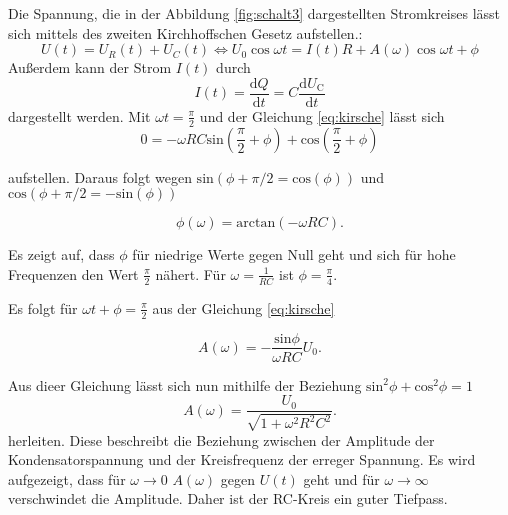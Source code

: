 \noindent Die Spannung, die in der Abbildung  \ref{fig:schalt3} dargestellten Stromkreises lässt sich  mittels des zweiten Kirchhoffschen Gesetz
aufstellen.:
\begin{equation}
    \label{eq:kirsche}
    U(t)=U_R(t)+U_C(t) \Leftrightarrow U_0 \cos{\omega t}=I(t)R + 
    A(\omega)\cos{\omega t + \phi}
\end{equation}
\noindent Außerdem kann der Strom $I(t)$ durch 
\begin{equation}
    I(t) = \frac{\text{d}Q}{\text{d}t} = C \frac{\text{d}U_\text{C}}{\text{d}t}
    \label{eqn:9}
\end{equation}
\noindent dargestellt werden. Mit  $\omega t = \frac{\pi}{2}$ und der Gleichung \ref{eq:kirsche} lässt sich 
\begin{equation*}
    0 = -\omega R C \text{sin} \left( \frac{\pi}{2} + \phi \right) + \text{cos} \left( \frac{\pi}{2} + \phi \right)
\end{equation*}

\noindent aufstellen.
Daraus folgt wegen $\text{sin}(\phi + \pi /2 = \text{cos}(\phi))$ und $\text{cos}(\phi + \pi/2 = - \text{sin}
(\phi))$

\begin{equation}
    \phi (\omega) = \text{arctan} ( - \omega R C) .
    \label{eqn:11}
\end{equation}

\noindent Es zeigt auf, dass $\phi$ für niedrige Werte gegen Null geht  und sich für hohe Frequenzen den Wert $\frac{\pi}{2}$ nähert.
Für $\omega = \frac{1}{RC}$ ist $\phi = \frac{\pi}{4}$.

Es folgt für $\omega t + \phi = \frac{\pi}{2}$ aus der Gleichung \ref{eq:kirsche}

\begin{equation}
    A(\omega) = - \frac{\text{sin} \phi}{\omega R C} U_0 .
    \label{eqn:12}
\end{equation}

\noindent Aus dieer Gleichung lässt sich nun mithilfe der Beziehung $\text{sin}^2 \phi + \text{cos}^2 \phi = 1$  
\begin{equation*}
    A(\omega) = \frac{U_0}{\sqrt{1 + \omega^2 R^2 C^2}} .
\end{equation*}
\noindent herleiten.
Diese beschreibt die Beziehung zwischen der Amplitude der Kondensatorspannung und der Kreisfrequenz der erreger Spannung.
Es wird aufgezeigt, dass für $\omega \rightarrow 0$ $A(\omega)$ gegen $U(t)$ geht und für $\omega \rightarrow \infty$ verschwindet
die Amplitude.
Daher ist der RC-Kreis ein guter Tiefpass.

